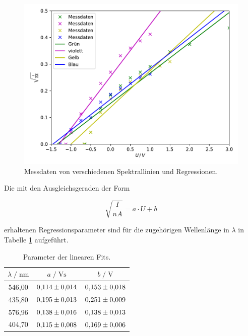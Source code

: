\begin{figure}
  \centering
  \includegraphics{content/plot1.pdf}
  \caption{Messdaten von verschiedenen Spektrallinien und Regressionen.}
  \label{fig:plot1}
\end{figure}

Die mit den Ausgleichsgeraden der Form 

\begin{equation*}
\sqrt{\frac{I}{nA}} = a\cdot U + b 
\end{equation*}

erhaltenen Regressionsparameter sind für die zugehörigen Wellenlänge in $\lambda$ in Tabelle \ref{tab:para} aufgeführt. 

\begin{table}
    \centering
    \caption{Parameter der linearen Fits.}
    \label{tab:para}
    \begin{tabular}{c c c}
    \toprule
    $ \lambda \;/\; \si{\nano\meter} $ & $a \;/\; \si{\volt\second}$ &
    $ b \;/\; \si{\volt}$\\
    \midrule 
      546,00 & $\num{0.114+-0.014}$ & $\num{0.153+-0.018}$\\ %
      435,80 & $\num{0.195+-0.013}$ & $\num{0.251+-0.009}$\\ %
      576,96 & $\num{0.138+-0.016}$ & $\num{0.138+-0.013}$\\ %
      404,70 & $\num{0.115+-0.008}$ & $\num{0.169+-0.006}$\\ %
    \bottomrule
    \end{tabular}
\end{table}

